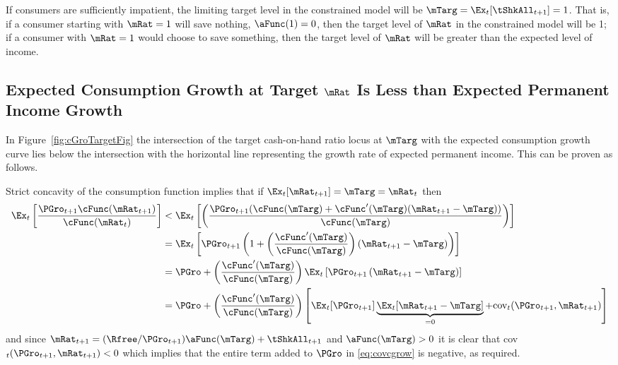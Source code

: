 \documentclass[BufferStockTheory]{subfiles}
\begin{document}
If consumers are sufficiently impatient, the limiting target level in the
constrained model will be $\mTarg = \Ex_{t}[{\tShkAll}_{t+1}] = 1$. That
is, if a consumer starting with $\mRat = 1$ will save nothing, ${\aFunc}(1)=0$,
then the target level of $\mRat$ in the constrained model will be 1; if a
consumer with $\mRat=1$ would choose to save something, then the target
level of $\mRat$ will be greater than the expected level of income.

\hypertarget{cGroLTpGro}{}
\subsection{Expected Consumption Growth at Target $\mRat$ Is Less than
  Expected Permanent Income Growth}

\label{subsec:expcgrowth} In Figure~\ref{fig:cGroTargetFig} the intersection of
the target cash-on-hand ratio locus at $\mTarg$ with the expected consumption
growth curve lies below the intersection with the horizontal line
representing the growth rate of expected permanent income. This can be
proven as follows.

Strict concavity of the consumption function implies that if $\Ex_{t}[{\mRat}_{t+1}] = \mTarg = \mRat_{t}$ then
\begin{align}
  \Ex_{t}\left[\frac{{\PGro}_{t+1} \cFunc({\mRat}_{t+1})}{\cFunc(\mRat_{t})}
  \right]  & < \Ex_{t}\left[\left(\frac{{\PGro}_{t+1}
             (\cFunc(\mTarg)+\cFunc^{\prime}(\mTarg)({\mRat}_{t+1}-\mTarg))}{\cFunc(\mTarg)}\right)\right]  \nonumber \\
           & = \Ex_{t}\left[{\PGro}_{t+1} \left(1+\left(\frac{\cFunc^{\prime}(\mTarg)}{%
             \cFunc(\mTarg)}\right)({\mRat}_{t+1}-\mTarg)\right)\right]  \nonumber  \\
           & = \PGro + \left(\frac{\cFunc^{\prime}(\mTarg)}{\cFunc(\mTarg)}\right)\Ex_{t}\left[ {\PGro}_{t+1}\left({\mRat}_{t+1}-\mTarg\right)\right]  \nonumber \\
           & = \PGro + \left(\frac{\cFunc^{\prime}(\mTarg)}{\cFunc(\mTarg)}\right)\left[
             \Ex_{t}[ \PGro_{t+1}]\underbrace{\Ex_{t}[
             {\mRat}_{t+1}-\mTarg]}_{=0}+\mbox{cov}_{t}( {\PGro}_{t+1},{\mRat}_{t+1})\right]
             \label{eq:covcgrow}
\end{align}
and since $\mRat_{t+1} = (\Rfree/\PGro_{t+1}) \aFunc(\mTarg)+\tShkAll_{t+1}$ and
$\aFunc(\mTarg)>0$ it is clear that
cov$_{t}({\PGro}_{t+1},{\mRat}_{t+1})<0$ which implies that
the entire term added to $\PGro$ in \eqref{eq:covcgrow} is negative, as
required.
\end{document}
